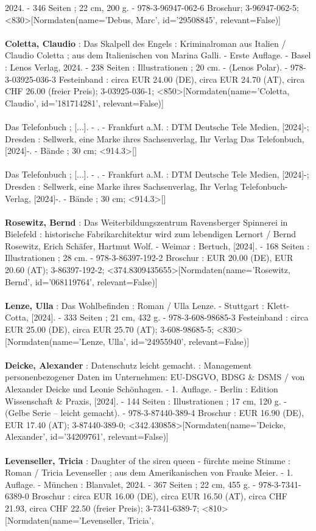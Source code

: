 \documentclass{article}
\begin{document}
\begin{multicols}{3}
2024. - 346 Seiten ; 22 cm, 200 g. - 978-3-96947-062-6 Broschur; 3-96947-062-5; <830>[Normdaten(name='Debus, Marc', id='29508845', relevant=False)]\\\\\textbf{Coletta, Claudio} : Das Skalpell des Engels : Kriminalroman aus Italien / Claudio Coletta ; aus dem Italienischen von Marina Galli. - Erste Auflage. - Basel : Lenos Verlag, 2024. - 238 Seiten : Illustrationen ; 20 cm. - (Lenos Polar). - 978-3-03925-036-3 Festeinband : circa EUR 24.00 (DE), circa EUR 24.70 (AT), circa CHF 26.00 (freier Preis); 3-03925-036-1; <850>[Normdaten(name='Coletta, Claudio', id='181714281', relevant=False)]\\\\Das Telefonbuch ; [...]. - . - Frankfurt a.M. : DTM Deutsche Tele Medien, [2024]-; Dresden : Sellwerk, eine Marke ihres Sachsenverlag, Ihr Verlag Das Telefonbuch, [2024]-. - Bände ; 30 cm; <914.3>[]\\\\Das Telefonbuch ; [...]. - . - Frankfurt a.M. : DTM Deutsche Tele Medien, [2024]-; Dresden : Sellwerk, eine Marke ihres Sachsenverlag, Ihr Verlag Telefonbuch-Verlag, [2024]-. - Bände ; 30 cm; <914.3>[]\\\\\textbf{Rosewitz, Bernd} : Das Weiterbildungszentrum Ravensberger Spinnerei in Bielefeld : historische Fabrikarchitektur wird zum lebendigen Lernort / Bernd Rosewitz, Erich Schäfer, Hartmut Wolf. - Weimar : Bertuch, [2024]. - 168 Seiten : Illustrationen ; 28 cm. - 978-3-86397-192-2 Broschur : EUR 20.00 (DE), EUR 20.60 (AT); 3-86397-192-2; <374.8309435655>[Normdaten(name='Rosewitz, Bernd', id='068119764', relevant=False)]\\\\\textbf{Lenze, Ulla} : Das Wohlbefinden : Roman / Ulla Lenze. - Stuttgart : Klett-Cotta, [2024]. - 333 Seiten ; 21 cm, 432 g. - 978-3-608-98685-3 Festeinband : circa EUR 25.00 (DE), circa EUR 25.70 (AT); 3-608-98685-5; <830>[Normdaten(name='Lenze, Ulla', id='24955940', relevant=False)]\\\\\textbf{Deicke, Alexander} : Datenschutz leicht gemacht. : Management personenbezogener Daten im Unternehmen: EU-DSGVO, BDSG \& DSMS / von Alexander Deicke und Leonie Schönhagen. - 1. Auflage. - Berlin : Edition Wissenschaft \& Praxis, [2024]. - 144 Seiten : Illustrationen ; 17 cm, 120 g. - (Gelbe Serie – leicht gemacht). - 978-3-87440-389-4 Broschur : EUR 16.90 (DE), EUR 17.40 (AT); 3-87440-389-0; <342.430858>[Normdaten(name='Deicke, Alexander', id='34209761', relevant=False)]\\\\\textbf{Levenseller, Tricia} : Daughter of the siren queen - fürchte meine Stimme : Roman / Tricia Levenseller ; aus dem Amerikanischen von Frauke Meier. - 1. Auflage. - München : Blanvalet, 2024. - 367 Seiten ; 22 cm, 455 g. - 978-3-7341-6389-0 Broschur : circa EUR 16.00 (DE), circa EUR 16.50 (AT), circa CHF 21.93, circa CHF 22.50 (freier Preis); 3-7341-6389-7; <810>[Normdaten(name='Levenseller, Tricia', 
\end{multicols}
\end{document}
